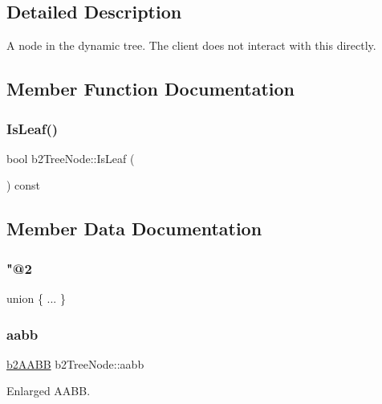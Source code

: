 \subsection{Detailed Description}
A node in the dynamic tree. The client does not interact with this directly. 

\subsection{Member Function Documentation}
\mbox{\label{structb2_tree_node_a540267ce6fa890822f1eea2d1967f646}} 
\subsubsection{\texorpdfstring{IsLeaf()}{IsLeaf()}}
{\footnotesize\ttfamily bool b2\+Tree\+Node\+::\+Is\+Leaf (\begin{DoxyParamCaption}{ }\end{DoxyParamCaption}) const\hspace{0.3cm}{\ttfamily [inline]}}



\subsection{Member Data Documentation}
\mbox{\label{structb2_tree_node_a9d8975d1e109fb59c7f549f1da7d75c4}} 
\subsubsection{\texorpdfstring{"@2}{@2}}
{\footnotesize\ttfamily union \{ ... \} }

\mbox{\label{structb2_tree_node_a798f1a594b33c713be45e76e79912239}} 
\subsubsection{\texorpdfstring{aabb}{aabb}}
{\footnotesize\ttfamily \mbox{\hyperlink{structb2_a_a_b_b}{b2\+A\+A\+BB}} b2\+Tree\+Node\+::aabb}



Enlarged A\+A\+BB. 

